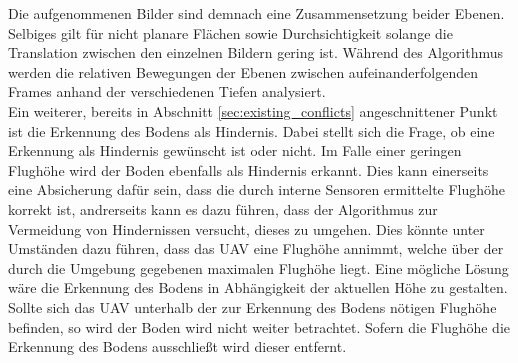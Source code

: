 \noindent
Die aufgenommenen Bilder sind demnach eine Zusammensetzung beider Ebenen. Selbiges gilt für nicht planare Flächen sowie Durchsichtigkeit solange die Translation zwischen den einzelnen Bildern gering ist. Während des Algorithmus werden die relativen Bewegungen der Ebenen zwischen aufeinanderfolgenden Frames anhand der verschiedenen Tiefen analysiert.\\

\noindent
Ein weiterer, bereits in Abschnitt \ref{sec:existing_conflicts} angeschnittener Punkt ist die Erkennung des Bodens als Hindernis. Dabei stellt sich die Frage, ob eine Erkennung als Hindernis gewünscht ist oder nicht. Im Falle einer geringen Flughöhe wird der Boden ebenfalls als Hindernis erkannt. Dies kann einerseits eine Absicherung dafür sein, dass die durch interne Sensoren ermittelte Flughöhe korrekt ist, andrerseits kann es dazu führen, dass der Algorithmus zur Vermeidung von Hindernissen versucht, dieses zu  umgehen. Dies könnte unter Umständen dazu führen, dass das UAV eine Flughöhe annimmt, welche über der durch die Umgebung gegebenen maximalen Flughöhe liegt. Eine mögliche Lösung wäre die Erkennung des Bodens in Abhängigkeit der aktuellen Höhe zu gestalten. Sollte sich das UAV unterhalb der zur Erkennung des Bodens nötigen Flughöhe befinden, so wird der Boden wird nicht weiter betrachtet. Sofern die Flughöhe die Erkennung des Bodens ausschließt wird dieser entfernt.\\

